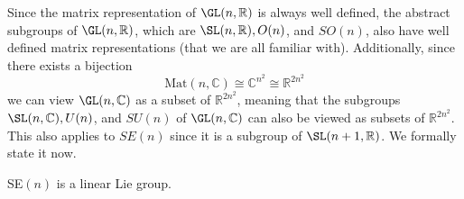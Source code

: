   Since the matrix representation of $\GL(n, \mathbb{R})$ is always well defined, the abstract subgroups of $\GL(n, \mathbb{R})$, which are $\SL(n, \mathbb{R}), O(n)$, and $SO(n)$, also have well defined matrix representations (that we are all familiar with). Additionally, since there exists a bijection
  \begin{equation}
    \text{Mat}(n, \mathbb{C}) \cong \mathbb{C}^{n^2} \cong \mathbb{R}^{2 n^2}
  \end{equation}
  we can view $\GL(n, \mathbb{C})$ as a subset of $\mathbb{R}^{2n^2}$, meaning that the subgroups $\SL(n, \mathbb{C}), U(n)$, and $SU(n)$ of $\GL(n, \mathbb{C})$ can also be viewed as subsets of $\mathbb{R}^{2n^2}$. This also applies to $SE(n)$ since it is a subgroup of $\SL(n+1, \mathbb{R})$. We formally state it now. 

  \begin{theorem}
    \label{thm:sen-is-a-linear-lie-group}
    SE$(n)$ is a linear Lie group. 
  \end{theorem}
